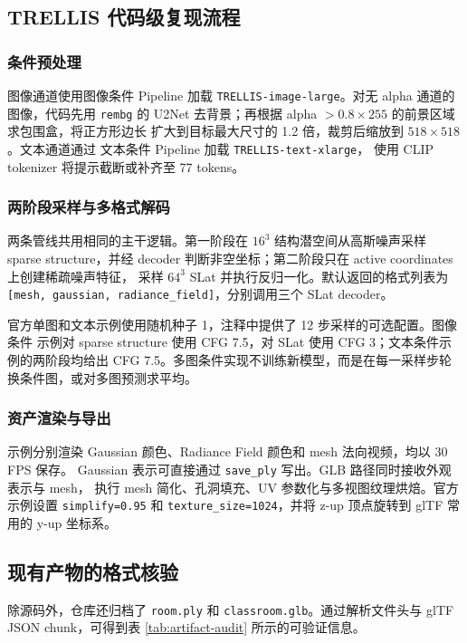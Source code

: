 \subsection{TRELLIS 代码级复现流程}

\subsubsection{条件预处理}

图像通道使用图像条件 Pipeline 加载 \texttt{TRELLIS-image-large}。对无 alpha 通道的图像，代码先用
\texttt{rembg} 的 U2Net 去背景；再根据 alpha $>0.8\times255$ 的前景区域求包围盒，将正方形边长
扩大到目标最大尺寸的 1.2 倍，裁剪后缩放到 $518\times518$。文本通道通过
文本条件 Pipeline 加载 \texttt{TRELLIS-text-xlarge}，
使用 CLIP tokenizer 将提示截断或补齐至 77 tokens。

\subsubsection{两阶段采样与多格式解码}

两条管线共用相同的主干逻辑。第一阶段在 $16^3$ 结构潜空间从高斯噪声采样 sparse
structure，并经 decoder 判断非空坐标；第二阶段只在 active coordinates 上创建稀疏噪声特征，
采样 $64^3$ SLat 并执行反归一化。默认返回的格式列表为
\texttt{[mesh, gaussian, radiance\_field]}，分别调用三个 SLat decoder。

官方单图和文本示例使用随机种子 1，注释中提供了 12 步采样的可选配置。图像条件
示例对 sparse structure 使用 CFG 7.5，对 SLat 使用 CFG 3；文本条件示例的两阶段均给出
CFG 7.5。多图条件实现不训练新模型，而是在每一采样步轮换条件图，或对多图预测求平均。

\subsubsection{资产渲染与导出}

示例分别渲染 Gaussian 颜色、Radiance Field 颜色和 mesh 法向视频，均以 30 FPS 保存。
Gaussian 表示可直接通过 \texttt{save\_ply} 写出。GLB 路径同时接收外观表示与 mesh，
执行 mesh 简化、孔洞填充、UV 参数化与多视图纹理烘焙。官方示例设置
\texttt{simplify=0.95} 和 \texttt{texture\_size=1024}，并将 z-up 顶点旋转到 glTF 常用的 y-up
坐标系。

\subsection{现有产物的格式核验}

除源码外，仓库还归档了 \texttt{room.ply} 和 \texttt{classroom.glb}。通过解析文件头与
glTF JSON chunk，可得到表 \ref{tab:artifact-audit} 所示的可验证信息。

